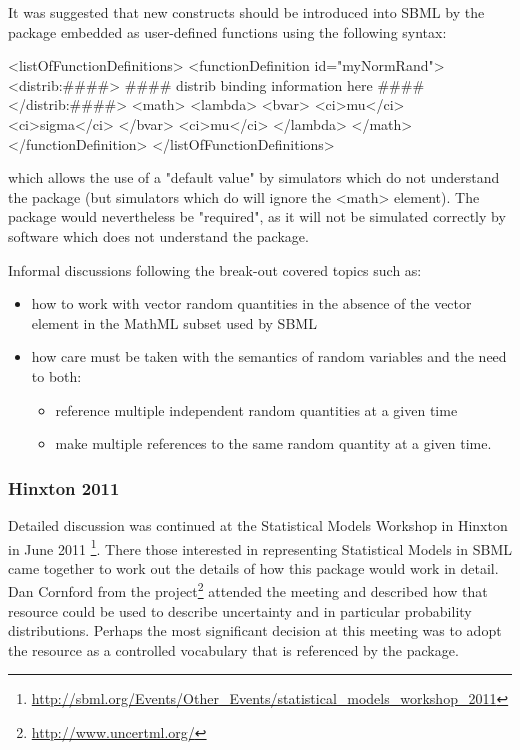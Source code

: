 \documentclass[draftspec]{sbmlpkgspec}
\begin{document}
It was suggested that new constructs should be introduced into SBML by
the package embedded as user-defined functions using the following
syntax:

\begin{example}
<listOfFunctionDefinitions>
  <functionDefinition id="myNormRand">
    <distrib:####>
      #### distrib binding information here ####
    </distrib:####>
    <math>
      <lambda>
        <bvar>
          <ci>mu</ci>
          <ci>sigma</ci>
        </bvar>
        <ci>mu</ci>
      </lambda>
    </math>
  </functionDefinition>
</listOfFunctionDefinitions>
\end{example}

which allows the use of a "default value" by simulators which do not
understand the package (but simulators which do will ignore the <math>
element). The package would nevertheless be "required", as it will not
be simulated correctly by software which does not understand the
package.

Informal discussions following the break-out covered topics such as:

\begin{itemize}
\item how to work with vector random quantities in the absence of the vector
element in the MathML subset used by SBML
\item how care must be taken with the semantics of random variables
  and the need to both:
\begin{itemize}
\item reference multiple independent random quantities at a given
  time
\item make multiple references to the same random quantity at a given
time.
\end{itemize}
\end{itemize}

\subsubsection{Hinxton 2011}

Detailed discussion was continued at the Statistical Models Workshop
in Hinxton in June 2011%
\footnote{\url{http://sbml.org/Events/Other_Events/statistical_models_workshop_2011}}. There
those interested in representing Statistical Models in SBML came
together to work out the details of how this package would work in
detail. Dan Cornford from the \uncertml
project\footnote{\url{http://www.uncertml.org/}} attended the meeting
and described how that resource could be used to describe uncertainty
and in particular probability distributions. Perhaps the most
significant decision at this meeting was to adopt the \uncertml
resource as a controlled vocabulary that is referenced by the \distrib package.
\end{document}
